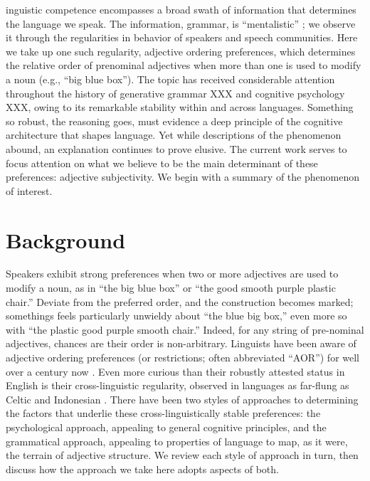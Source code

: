 \documentclass{pnastwo}
\begin{document}
\begin{article}
\begin{abstract}
{Abstract here\ldots}
\end{abstract}



inguistic competence encompasses a broad swath of information that determines the language we speak. The information, grammar, is ``mentalistic'' \cite{chomsky1965}; we observe it through the regularities in behavior of speakers and speech communities. Here we take up one such regularity, adjective ordering preferences, which determines the relative order of prenominal adjectives when more than one is used to modify a noun (e.g., ``big blue box''). The topic has received considerable attention throughout the history of generative grammar XXX and cognitive psychology XXX, owing to its remarkable stability within and across languages. Something so robust, the reasoning goes, must evidence a deep principle of the cognitive architecture that shapes language. Yet while descriptions of the phenomenon abound, an explanation continues to prove elusive. The current work serves to focus attention on what we believe to be the main determinant of these preferences: adjective subjectivity. We begin with a summary of the phenomenon of interest.

\section{Background}
Speakers exhibit strong preferences when two or more adjectives are used to modify a noun, as in ``the big blue box'' or ``the good smooth purple plastic chair.'' Deviate from the preferred order, and the construction becomes marked; somethings feels particularly unwieldy about ``the blue big box,'' even more so with ``the plastic good purple smooth chair.'' Indeed, for any string of pre-nominal adjectives, chances are their order is non-arbitrary. Linguists have been aware of adjective ordering preferences (or restrictions; often abbreviated ``AOR'') for well over a century now \cite{sweet1898,bloomfield1933}. Even more curious than their robustly attested status in English is their cross-linguistic regularity, observed in languages as far-flung as Celtic \cite{sproatshih1991} and Indonesian \cite{martin1969competence}. There have been two styles of approaches to determining the factors that underlie these cross-linguistically stable preferences: the psychological approach, appealing to general cognitive principles, and the grammatical approach, appealing to properties of language to map, as it were, the terrain of adjective structure. We review each style of approach in turn, then discuss how the approach we take here adopts aspects of both.

\end{article}
\end{document}
